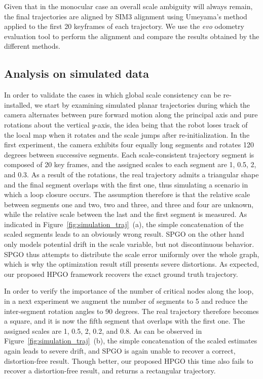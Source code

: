 \documentclass[letterpaper, 10 pt, conference]{ieeeconf}  %
\begin{document}
Given that in the monocular case an overall scale ambiguity will always remain, the final trajectories are aligned by SIM3 alignment using Umeyama's method \cite{umeyama1991least} applied to the first 20 keyframes of each trajectory. We use the \textit{evo} odometry evaluation tool \cite{grupp2017evo} to perform the alignment and compare the results obtained by the different methods.

\subsection{Analysis on simulated data}

In order to validate the cases in which global scale consistency can be re-installed, we start by examining simulated planar trajectories during which the camera alternates between pure forward motion along the principal axis and pure rotations about the vertical $y$-axis, the idea being that the robot loses track of the local map when it rotates and the scale jumps after re-initialization. In the first experiment, the camera exhibits four equally long segments and rotates 120 degrees between successive segments. Each scale-consistent trajectory segment is composed of 20 key frames, and the assigned scales to each segment are 1, 0.5, 2, and 0.3. As a result of the rotations, the real trajectory admits a triangular shape and the final segment overlaps with the first one, thus simulating a scenario in which a loop closure occurs. The assumption therefore is that the relative scale between segments one and two, two and three, and three and four are unknown, while the relative scale between the last and the first segment is measured. As indicated in Figure~\ref{fig:simulation_traj}~(a), the simple concatenation of the scaled segments leads to an obviously wrong result. SPGO on the other hand only models potential drift in the scale variable, but not discontinuous behavior. SPGO thus attempts to distribute the scale error uniformly over the whole graph, which is why the optimization result still presents severe distortions. As expected, our proposed HPGO framework recovers the exact ground truth trajectory.

In order to verify the importance of the number of critical nodes along the loop, in a next experiment we augment the number of segments to 5 and reduce the inter-segment rotation angles to 90 degrees. The real trajectory therefore becomes a square, and it is now the fifth segment that overlaps with the first one. The assigned scales are 1, 0.5, 2, 0.2, and 0.8. As can be observed in Figure~\ref{fig:simulation_traj}~(b), the simple concatenation of the scaled estimates again leads to severe drift, and SPGO is again unable to recover a correct, distortion-free result. Though better, our proposed HPGO this time also fails to recover a distortion-free result, and returns a rectangular trajectory.
\end{document}
